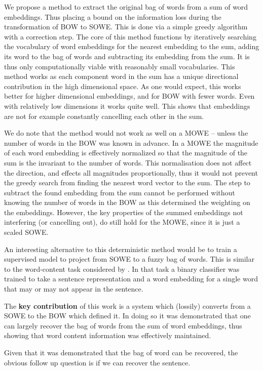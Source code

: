\documentclass{book}
\begin{document}
We propose a method to extract the original bag of words from a sum of word embeddings.
Thus placing a bound on the information loss during the transformation of BOW to SOWE. This is done via a simple greedy algorithm with a correction step.
The core of this method functions by iteratively searching the vocabulary of word embeddings for the nearest embedding to the sum,
adding its word to the bag of words and subtracting its embedding from the sum.
It is thus only computationally viable with reasonably small vocabularies.
This method works as each component word in the sum has a unique directional contribution in the high dimensional space.
As one would expect, this works better for higher dimensional embeddings, and for BOW with fewer words.
Even with relatively low dimensions it works quite well.
This shows that embeddings are not for example constantly cancelling each other in the sum.

We do note that the method would not work as well on a MOWE -- unless the number of words in the BOW was known in advance.
In a MOWE the magnitude of each word embedding is effectively normalized so that the magnitude of the sum is the invariant to the number of words.
This normalisation does not affect the direction, and effects all magnitudes proportionally,
thus it would not prevent the greedy search from finding the nearest word vector to the sum.
The step to subtract the found embedding from the sum cannot be performed without knowing the number of words in the BOW as this determined the weighting on the embeddings.
However, the key properties of the summed embeddings not interfering (or cancelling out),
do still hold for the MOWE, since it is just a scaled SOWE.



An interesting alternative to this deterministic method would be to train a supervised model to project from SOWE to a fuzzy bag of words.
This is similar to the word-content task considered by
\citet{adi2017Probing}.
In that task a binary classifier was trained to take a sentence representation and a word embedding for a single word that may or may not appear in the sentence.


The \textbf{key contribution} of this work is a system which (lossily) converts from a SOWE to the BOW which defined it.
In doing so it was demonstrated that one can largely recover the bag of words from the sum of word embeddings, thus showing that word content information was effectively maintained.


Given that it was demonstrated that the bag of word can be recovered,
the obvious follow up question is if we can recover the  sentence.
\end{document}
